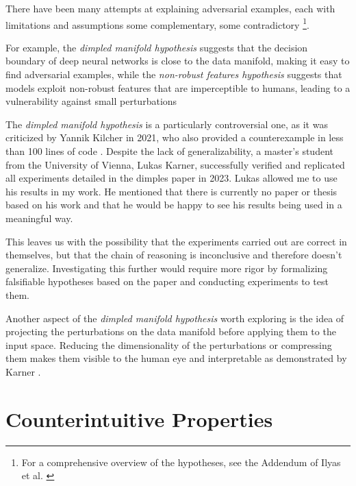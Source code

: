 \documentclass[a4paper, oneside]{discothesis}
\begin{document}
There have been many attempts at explaining adversarial examples, each with limitations and assumptions \textendash{} some complementary, some contradictory  \footnote{For a comprehensive overview of the hypotheses, see the Addendum of Ilyas et al. \cite{ilyas2019adversarial}}.

For example, the \textit{dimpled manifold hypothesis} \cite{shamir2021dimpled}  suggests that the decision boundary of deep neural networks is close to the data manifold, making it easy to find adversarial examples, while the \textit{non-robust features hypothesis} \cite{ilyas2019adversarial} suggests that models exploit non-robust features that are imperceptible to humans, leading to a vulnerability against small perturbations

The \textit{dimpled manifold hypothesis} is a particularly controversial one, as it was criticized by Yannik Kilcher \cite{kilcher2021dimpled} in 2021, who also provided a counterexample in less than 100 lines of code \cite{kilcher2021dimpledcode}. Despite the lack of generalizability, a master's student from the University of Vienna, Lukas Karner, successfully verified and replicated all experiments detailed in the dimples paper \cite{karner2023dimpled} in 2023. Lukas allowed me to use his results in my work. He mentioned that there is currently no paper or thesis based on his work and that he would be happy to see his results being used in a meaningful way.

This leaves us with the possibility that the experiments carried out are correct in themselves, but that the chain of reasoning is inconclusive and therefore doesn't generalize. Investigating this further would require more rigor by formalizing falsifiable hypotheses based on the paper and conducting experiments to test them.

Another aspect of the \textit{dimpled manifold hypothesis} worth exploring is the idea of projecting the perturbations on the data manifold before applying them to the input space. Reducing the dimensionality of the perturbations or compressing them makes them visible to the human eye and interpretable as demonstrated by Karner \cite{karner2023dimpled}.

\section{Counterintuitive Properties}

\end{document}
